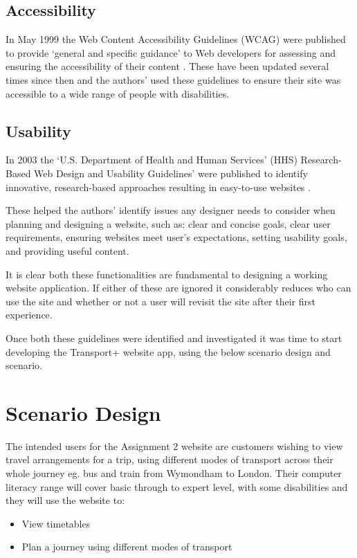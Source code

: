 \documentclass{ueacmpstyle}
\begin{document}
\subsection{Accessibility}
In May 1999 the Web Content Accessibility Guidelines (WCAG) were published to provide `general and specific guidance'
to Web developers for assessing and ensuring the accessibility of their content \citep{world2008web}. These have been updated several times since then and the authors' used these guidelines to ensure their site was accessible to a wide range of people with disabilities.

\subsection{Usability}
In 2003 the `U.S. Department of Health and Human Services’ (HHS) Research-Based Web Design and Usability Guidelines' were published to identify innovative, research-based approaches resulting in easy-to-use websites \citep{leavitt2006based}. 

These helped the authors' identify issues any designer needs to consider when planning and designing a website, such as: clear and concise goals, clear user requirements, ensuring websites meet user’s expectations, setting usability goals, and providing useful content.

It is clear both these functionalities are fundamental to designing a working website application. If either of these are ignored it considerably reduces who can use the site and whether or not a user will revisit the site after their first experience.

Once both these guidelines were identified and investigated it was time to start developing the Transport+ website app, using the below scenario design and scenario.

\section{Scenario Design}
The intended users for the Assignment 2 website are customers wishing to view travel arrangements for a trip, using different modes of transport across their whole journey eg. bus and train from Wymondham to London. Their computer literacy range will cover basic through to expert level, with some disabilities and they will use the website to:

\begin{itemize}
	\item View timetables
	\item Plan a journey using different modes of transport
\end{itemize}
\end{document}
